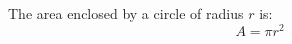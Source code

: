\documentclass{article}
\begin{document}
The area enclosed by a circle of radius $r$ is:
\begin{equation}
  A = \pi r^2

\end{equation}
\end{document}
